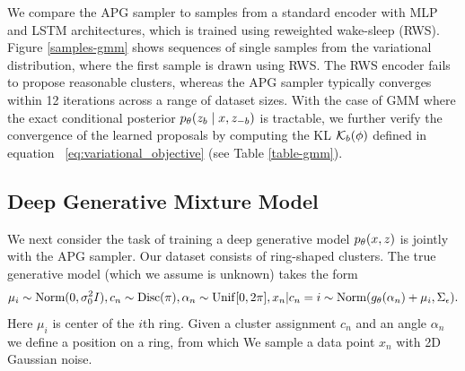 \documentclass[anonymous=false, %
               format=acmsmall, %
               review=true, %
               screen=true, %
               nonacm=true]{acmart}
\theoremstyle{definition}
\begin{document}
We compare the APG sampler to samples from a standard encoder with MLP and LSTM architectures,  which is trained using reweighted wake-sleep (RWS). Figure \ref{samples-gmm} shows sequences of single samples from the variational distribution, where the first sample is drawn using RWS. The RWS encoder fails to propose reasonable clusters, whereas the APG sampler typically converges within 12 iterations across a range of dataset sizes. With the case of GMM where the exact conditional posterior  $p_\theta(z_b \mid x, z_{-b})$ is tractable, we further verify the convergence of the learned proposals by computing the KL $\mathcal{K}_b(\phi)$ defined in equation ~\ref{eq:variational_objective} (see Table \ref{table-gmm}).


\subsection{Deep Generative Mixture Model}
We next consider the task of training a deep generative model $p_\theta(x, z)$ is jointly with the APG sampler. Our dataset consists of ring-shaped clusters. The true generative model (which we assume is unknown) takes the form
\begin{align*}
    \mu_i \sim \text{Norm}(0, 
    \sigma_0^2 I)
    ,
    c_n \sim \mathrm{Disc}(\pi)
    , 
    \alpha_n \sim \mathrm{Unif}[0, 2\pi]
    ,
    x_n | c_n=i \sim \text{Norm}(g_\theta(\alpha_n) + \mu_i, \Sigma_\epsilon).
\end{align*}
Here $\mu_i$ is center of the $i$th ring. Given a cluster assignment $c_n$ and an angle $\alpha_n$ we define a position on a ring, from which We sample a data point $x_n$ with 2D Gaussian noise.
\end{document}
